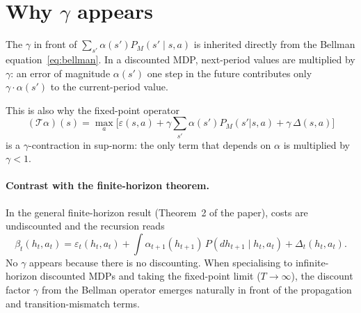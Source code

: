 \documentclass[11pt]{article}
\begin{document}
\section{Why $\gamma$ appears}

The $\gamma$ in front of $\sum_{s'} \alpha(s') P_M(s' \mid s, a)$ is
inherited directly from the Bellman equation~\eqref{eq:bellman}.  In a
discounted MDP, next-period values are multiplied by $\gamma$: an error of
magnitude $\alpha(s')$ one step in the future contributes only
$\gamma \cdot \alpha(s')$ to the current-period value.

This is also why the fixed-point operator
\[
  (\mathcal{T}\alpha)(s)
  = \max_a \bigl[
    \varepsilon(s,a) + \gamma \textstyle\sum_{s'} \alpha(s') P_M(s'|s,a) + \gamma\,\Delta(s,a)
  \bigr]
\]
is a $\gamma$-contraction in sup-norm: the only term that depends on $\alpha$
is multiplied by $\gamma < 1$.

\paragraph{Contrast with the finite-horizon theorem.}
In the general finite-horizon result (Theorem~2 of the paper), costs are
undiscounted and the recursion reads
\[
  \beta_t(h_t, a_t)
  = \varepsilon_t(h_t, a_t)
  + \int \alpha_{t+1}(h_{t+1})\, P(dh_{t+1} \mid h_t, a_t)
  + \Delta_t(h_t, a_t).
\]
No $\gamma$ appears because there is no discounting.  When specialising to
infinite-horizon discounted MDPs and taking the fixed-point limit ($T \to
\infty$), the discount factor $\gamma$ from the Bellman operator emerges
naturally in front of the propagation and transition-mismatch terms.
\end{document}
